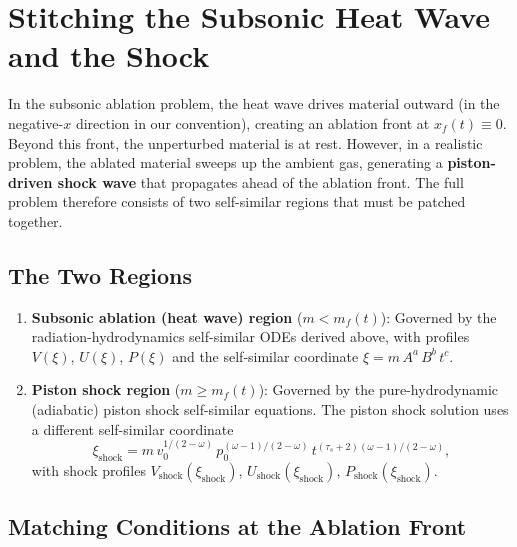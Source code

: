 \documentclass[11pt]{article}
\begin{document}
\section{Stitching the Subsonic Heat Wave and the Shock}
\label{sec:stitching}

In the subsonic ablation problem, the heat wave drives material outward (in the negative-$x$ direction in our convention), creating an ablation front at $x_f(t) \equiv 0$. Beyond this front, the unperturbed material is at rest. However, in a realistic problem, the ablated material sweeps up the ambient gas, generating a \textbf{piston-driven shock wave} that propagates ahead of the ablation front. The full problem therefore consists of two self-similar regions that must be patched together.

\subsection{The Two Regions}

\begin{enumerate}
\item \textbf{Subsonic ablation (heat wave) region} ($m < m_f(t)$): \newline
Governed by the radiation-hydrodynamics self-similar ODEs derived above, with profiles $V(\xi)$, $U(\xi)$, $P(\xi)$ and the self-similar coordinate $\xi = m\,A^a\,B^b\,t^c$.

\item \textbf{Piston shock region} ($m \geq m_f(t)$): \newline
Governed by the pure-hydrodynamic (adiabatic) piston shock self-similar equations. The piston shock solution uses a different self-similar coordinate
\begin{equation}
  \xi_{\mathrm{shock}} = m\,v_0^{1/(2-\omega)}\,
  p_0^{(\omega-1)/(2-\omega)}\,t^{(\tau_s+2)(\omega-1)/(2-\omega)},
\end{equation}
with shock profiles $V_{\mathrm{shock}}(\xi_{\mathrm{shock}})$, $U_{\mathrm{shock}}(\xi_{\mathrm{shock}})$, $P_{\mathrm{shock}}(\xi_{\mathrm{shock}})$.
\end{enumerate}

\subsection{Matching Conditions at the Ablation Front}
\label{sec:matching}
\end{document}
